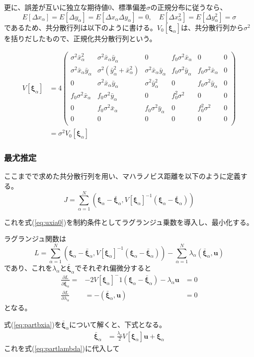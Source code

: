 \documentclass[12pt,a4j]{jsarticle}
\newcommand{\bxa}{\bar{x}_\alpha}
\newcommand{\dxa}{\Delta x_\alpha}
\newcommand{\bya}{\bar{y}_\alpha}
\newcommand{\dya}{\Delta y_\alpha}
\newcommand{\xia}{\bm{\xi}_\alpha}
\newcommand{\bxia}{\bar{\bm{\xi}}_\alpha}
\begin{document}
      更に、誤差が互いに独立な期待値$0$、標準偏差$\sigma$の正規分布に従うなら、
      \begin{equation}
        E[\dxa] = E[\dya] = E[\dxa\dya] = 0, \quad E[\dxa^2] = E[\dya^2] = \sigma
      \end{equation}
      であるため、共分散行列は以下のように書ける。$V_0[\xia]$は、共分散行列から$\sigma^2$を括りだしたもので、正規化共分散行列という。

      \begin{align}
        V[\xia] &= 4 \begin{pmatrix}
          \sigma^2\bxa^2 & \sigma^2\bxa\bya & 0 & f_0\sigma^2\bxa & 0 & 0 \\
          \sigma^2\bxa\bya & \sigma^2(\bya^2 + \bxa^2) & \sigma^2\bxa\bya & f_0\sigma^2\bya & f_0\sigma^2\bxa & 0 \\
          0 & \sigma^2\bxa\bya & \sigma^2\bya^2 & 0 & f_0\sigma^2\bya & 0 \\
          f_0\sigma^2\bxa & f_0\sigma^2\bya & 0 & f_0^2\sigma^2 & 0 & 0 \\
          0 & f_0\sigma^2\bxa & f_0\sigma^2\bya & 0 & f_0^2\sigma^2 & 0 \\
          0 & 0 & 0 & 0 & 0 & 0 \\
        \end{pmatrix} \\
         &= \sigma^2 V_0[\xia] 
      \end{align}
    
    \subsubsection*{最尤推定}
      ここまでで求めた共分散行列を用い、マハラノビス距離を以下のように定義する。
      \begin{equation}
        J = \sum_{\alpha = 1}^N \left(\xia - \bxia, V[\xia]^{-1} (\xia - \bxia) \right)
      \end{equation}
      
      これを式(\ref{eq:uxia0})を制約条件としてラグランジュ乗数を導入し、最小化する。\par
      ラグランジュ関数は
      \begin{equation}
        L = \sum_{\alpha = 1}^N \left(\xia - \bxia, V[\xia]^{-1} (\xia - \bxia) \right) - \sum_{\alpha = 1}^N \lambda_\alpha (\bxia, \bm{u})
      \end{equation}
      であり、これを$\lambda_\alpha$と$\bxia$でそれぞれ偏微分すると
      \begin{align}
        \frac{\partial L}{\partial \bxia} =& -2V[\xia]^-1(\xia - \bxia) - \lambda_\alpha\bm{u} &= 0 \label{eq:partbxia} \\
        \frac{\partial L}{\partial \lambda_\alpha} &= -(\bxia, \bm{u}) &= 0 \label{eq:partlambda}
      \end{align}
      となる。

      式(\ref{eq:partbxia})を$\bxia$について解くと、下式となる。
      \begin{align}
        \bxia &= \frac{\lambda_a}{2}V[\xia]\bm{u} + \xia 
      \end{align}
      これを式(\ref{eq:partlambda})に代入して
\end{document}
